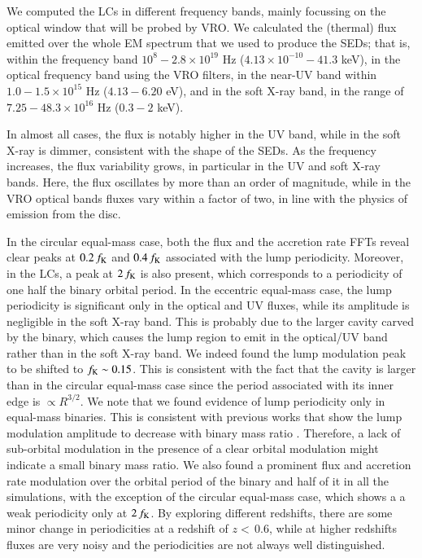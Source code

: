 \documentclass{aa}
\begin{document}
We computed the LCs in different frequency bands, mainly focussing on the optical window that will be probed by VRO. We calculated the (thermal) flux emitted over the whole EM spectrum that we used to produce the SEDs; that is, within the frequency band $10^8-2.8 \times 10^{19}$ Hz  ($4.13 \times 10^{-10}-41.3$ keV), in the optical frequency band using the VRO filters, in the near-UV band within $1.0 - 1.5 \times 10^{15}$ Hz ($4.13-6.20$ eV), and in the soft X-ray band, in the range of $7.25-48.3 \times 10^{16}$ Hz ($0.3- 2$ keV).

In almost all cases, the flux is notably higher in the UV band, while in the soft X-ray is dimmer, consistent with the shape of the SEDs. As the frequency increases, the flux variability grows, in particular in the UV and soft X-ray bands. Here, the flux oscillates by more than  an order of magnitude, while in the VRO optical bands fluxes vary within a factor of two, in line with the physics of emission from the disc.

In the circular equal-mass case, both the flux and the accretion rate FFTs reveal clear peaks at $0.2 \, f_{\rm K}$ and  $0.4 \, f_{\rm K}$ associated with the lump periodicity. Moreover, in the LCs, a peak at $2 \, f_{\rm K}$ is also present, which corresponds to a periodicity of one half the binary orbital period. 
In the eccentric equal-mass case, the lump periodicity is significant only in the optical and UV fluxes, while its amplitude is negligible in the soft X-ray band. This is probably due to the larger cavity carved by the binary, which causes the lump region to emit in the optical/UV band rather than in the soft X-ray band.  
We indeed found the lump modulation peak to be shifted to $f_{\rm K} \sim 0.15$. This is consistent with the fact that the cavity is larger than in the circular equal-mass case since the period associated with its inner edge is $\propto R^{3/2}$.
We note that we found evidence of lump periodicity only in equal-mass binaries. This is consistent with previous works that show the lump modulation amplitude to decrease with binary mass ratio \citep{dorazio2013}.
Therefore, a lack of sub-orbital modulation in the presence of a clear orbital modulation might indicate a small binary mass ratio.
We also found a prominent flux and accretion rate modulation over the orbital period of the binary and half of it in all the simulations, with the exception of the circular equal-mass case, which shows a a weak periodicity only at $2\, f_{\rm K}$.
By exploring different redshifts, there are some minor change in periodicities at a redshift of $z<\, 0.6$, while at higher redshifts fluxes are very noisy and the periodicities are not always well distinguished.
\end{document}

